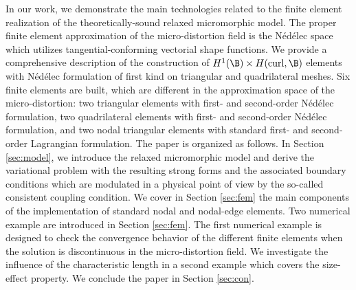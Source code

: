  In our work, we demonstrate the main technologies related to the finite element realization of the theoretically-sound relaxed micromorphic model. The proper finite element approximation of the micro-distortion field is the N\'ed\'elec space which utilizes tangential-conforming vectorial shape functions. We provide a comprehensive description of the construction of  $H^1(\B) \times H(\curl, \B)$ elements with N\'ed\'elec  formulation of  first kind on triangular and quadrilateral meshes.  Six finite elements are built, which are different in the approximation space of the micro-distortion: two triangular elements with first- and second-order N\'ed\'elec formulation, two quadrilateral elements with first- and second-order N\'ed\'elec formulation, and two nodal triangular elements with standard  first- and second-order Lagrangian formulation. The paper is organized as follows. In Section \ref{sec:model}, we introduce the relaxed micromorphic model and derive the variational problem with the resulting strong forms and  the associated boundary conditions which are modulated in a physical point of view by the so-called consistent coupling condition. We cover in Section \ref{sec:fem} the main components of the implementation of standard nodal and nodal-edge elements. Two numerical example are introduced in Section \ref{sec:fem}. The first numerical example is designed to check the convergence behavior of the different finite elements when the solution is discontinuous in the micro-distortion field. We investigate the influence of the characteristic length in a second example which covers the size-effect property. We conclude the paper in Section \ref{sec:con}. 
